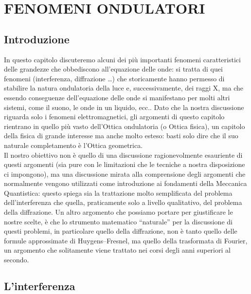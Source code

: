 \section{FENOMENI ONDULATORI}

\subsection{Introduzione}

In questo capitolo discuteremo alcuni dei pi\`u importanti fenomeni
caratteristici delle grandezze che obbediscono all'equazione delle onde: si
tratta di quei fenomeni (interferenza, diffrazione \dots) che storicamente hanno
permesso di stabilire la natura ondulatoria della luce e, successivamente, dei
raggi X, ma che essendo conseguenze dell'equazione delle onde si manifestano per
molti altri sistemi, come il suono, le onde in un liquido, ecc.. Dato che la
nostra discussione riguarda solo i fenomeni elettromagnetici, gli argomenti di
questo capitolo rientrano in quello pi\`u vasto dell'Ottica ondulatoria (o
Ottica fisica), un capitolo della fisica di grande interesse ma anche molto
esteso: basti solo dire che il suo naturale completamento \`e l'Ottica
geometrica.\\
Il nostro obiettivo non \`e quello di una discussione ragionevolmente esauriente
di questi argomenti (sia pure con le limitazioni che le tecniche a nostra
disposizione ci impongono), ma una discussione mirata alla comprensione degli
argomenti che normalmente vengono utilizzati come introduzione ai fondamenti
della Meccanica Quantistica: questo spiega sia la trattazione molto semplificata
del problema dell'interferenza che quella, praticamente solo a livello
qualitativo, del problema della diffrazione. Un altro argomento che possiamo
portare per giustificare le nostre scelte, \`e che lo strumento matematico
``naturale'' per la discussione di questi problemi, in particolare quello della
diffrazione, non \`e tanto quello delle formule approssimate di
Huygens--Fresnel, ma quello della trasformata di Fourier, un argomento che
solitamente viene trattato nei corsi degli anni superiori al secondo.

\subsection{L'interferenza}


